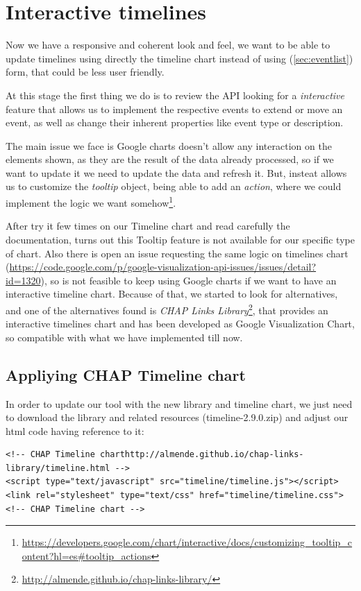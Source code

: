 \chapter{Interactive timelines}
Now we have a responsive and coherent look and feel, we want to be able to
update timelines using directly the timeline chart instead of using 
(\ref{sec:eventlist}) form, that could be less user friendly.

At this stage the first thing we do is to review the API looking for a
\emph{interactive} feature that allows us to implement the respective events to
extend or move an event, as well as change their inherent properties like event
type or description.

The main issue we face is Google charts doesn't allow any interaction on the
elements shown, as they are the result of the data already processed, so if we
want to update it we need to update the data and refresh it. But, insteat allows
us to customize the \emph{tooltip} object, being able to add an \emph{action},
where we could implement the logic we want
somehow\footnote{\url{https://developers.google.com/chart/interactive/docs/customizing_tooltip_content?hl=es#tooltip_actions}}.

After try it few times on our Timeline chart and read carefully the
documentation, turns out this Tooltip feature is not available for our specific
type of chart. Also there is open an issue requesting the same logic on
timelines chart
(\url{https://code.google.com/p/google-visualization-api-issues/issues/detail?id=1320}),
so is not feasible to keep using Google charts if we want to have an interactive
timeline chart. Because of that, we started to look for alternatives, and one of
the alternatives found is \emph{CHAP Links
Library}\footnote{\url{http://almende.github.io/chap-links-library/}}, that
provides an interactive timelines chart and has been developed as Google
Visualization Chart, so compatible with what we have implemented till now.

\section{Appliying CHAP Timeline chart}
In order to update our tool with the new library and timeline chart, we just
need to download the library and related resources (timeline-2.9.0.zip) and
adjust our html code having reference to it:

\begin{lstlisting}[style=html,breaklines=true,caption=CHAP\ Link\
library,label=f_interactivetimelines_code]
<!-- CHAP Timeline charthttp://almende.github.io/chap-links-library/timeline.html -->
<script type="text/javascript" src="timeline/timeline.js"></script> 
<link rel="stylesheet" type="text/css" href="timeline/timeline.css">
<!-- CHAP Timeline chart -->
\end{lstlisting} 

